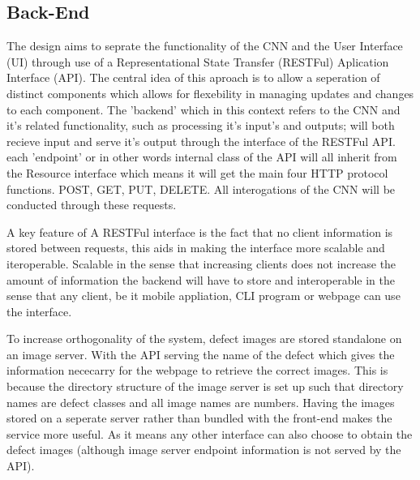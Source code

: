     \subsection{Back-End}
      The design aims to seprate the functionality of the CNN and the User Interface (UI) through use of a Representational State Transfer (RESTFul) Aplication Interface (API). The central idea of this aproach is to allow a seperation of distinct components which allows for flexebility in managing updates and changes to each component. The 'backend' which in this context refers to the CNN and it's related functionality, such as processing it's input's and outputs; will both recieve input and serve it's output through the interface of the RESTFul API. each 'endpoint' or in other words internal class of the API will all inherit from the Resource interface which means it will get the main four HTTP protocol functions. POST, GET, PUT, DELETE. All interogations of the CNN will be conducted through these requests.
      \par
      A key feature of A RESTFul interface is the fact that no client information is stored
      between requests, this aids in making the interface more scalable and iteroperable. Scalable in the sense that increasing clients does not increase the amount of information the backend will have to store and interoperable in the sense that any client, be it mobile appliation, CLI program or webpage can use the interface.
      \par
      To increase orthogonality of the system, defect images are stored standalone on an image server. With the API serving the name of the defect which gives the information nececarry for the webpage to retrieve the correct images. This is because the directory structure of the image server is set up such that directory names are defect classes and all image names are numbers. Having the images stored on a seperate server rather than bundled with the front-end makes the service more useful. As it means any other interface can also choose to obtain the defect images (although image server endpoint information is not served by the API).


